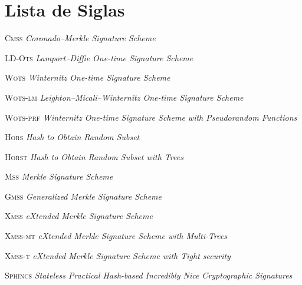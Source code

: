 \documentclass[12pt,notitlepage]{report}
\begin{document}
\listoffigures

\listoftables

\listofalgorithms

\chapter*{Lista de Siglas}
\begin{abbrv}
    \item[\textsc{Cmss}]        \emph{Coronado--Merkle Signature Scheme}
    \item[\textsc{LD-Ots}]      \emph{Lamport--Diffie One-time Signature Scheme}
    \item[\textsc{Wots}]        \emph{Winternitz One-time Signature Scheme}
    \item[\textsc{Wots-lm}]     \emph{Leighton--Micali--Winternitz One-time Signature Scheme}
    \item[\textsc{Wots-prf}]    \emph{Winternitz One-time Signature Scheme with Pseudorandom Functions}
    \item[\textsc{Hors}]        \emph{Hash to Obtain Random Subset}
    \item[\textsc{Horst}]       \emph{Hash to Obtain Random Subset with Trees}
    \item[\textsc{Mss}]         \emph{Merkle Signature Scheme}
    \item[\textsc{Gmss}]        \emph{Generalized Merkle Signature Scheme}
    \item[\textsc{Xmss}]        \emph{eXtended Merkle Signature Scheme}
    \item[\textsc{Xmss-mt}]     \emph{eXtended Merkle Signature Scheme with Multi-Trees}
    \item[\textsc{Xmss-t}]      \emph{eXtended Merkle Signature Scheme with Tight security}
    \item[\textsc{Sphincs}]     \emph{Stateless Practical Hash-based Incredibly Nice Cryptographic
Signatures}
\end{abbrv}

\newpage
\end{document}
